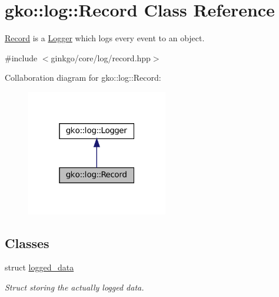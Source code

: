 \hypertarget{classgko_1_1log_1_1Record}{}\section{gko\+:\+:log\+:\+:Record Class Reference}
\label{classgko_1_1log_1_1Record}


\hyperlink{classgko_1_1log_1_1Record}{Record} is a \hyperlink{classgko_1_1log_1_1Logger}{Logger} which logs every event to an object.  




{\ttfamily \#include $<$ginkgo/core/log/record.\+hpp$>$}



Collaboration diagram for gko\+:\+:log\+:\+:Record\+:
\nopagebreak
\begin{figure}[H]
\begin{center}
\leavevmode
\includegraphics[width=175pt]{classgko_1_1log_1_1Record__coll__graph}
\end{center}
\end{figure}
\subsection*{Classes}
\begin{DoxyCompactItemize}
\item 
struct \hyperlink{structgko_1_1log_1_1Record_1_1logged__data}{logged\+\_\+data}
\begin{DoxyCompactList}\small\item\em Struct storing the actually logged data. \end{DoxyCompactList}\end{DoxyCompactItemize}
